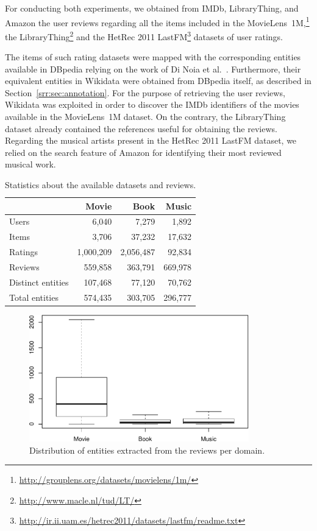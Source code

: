 For conducting both experiments, we obtained from IMDb, LibraryThing, and Amazon the user reviews regarding all the items included in the MovieLens~1M,\footnote{\url{http://grouplens.org/datasets/movielens/1m/}} the LibraryThing\footnote{\url{http://www.macle.nl/tud/LT/}} and the HetRec 2011 LastFM\footnote{\url{http://ir.ii.uam.es/hetrec2011/datasets/lastfm/readme.txt}} datasets of user ratings.

The items of such rating datasets were mapped with the corresponding entities available in DBpedia relying on the work of Di Noia et al.~\cite{DiNoia2016}. Furthermore, their equivalent entities in Wikidata were obtained from DBpedia itself, as described in Section~\ref{srr:sec:annotation}. For the purpose of retrieving the user reviews, Wikidata was exploited in order to discover the IMDb identifiers of the movies available in the MovieLens~1M dataset. On the contrary, the LibraryThing dataset already contained the references useful for obtaining the reviews. Regarding the musical artists present in the HetRec 2011 LastFM dataset, we relied on the search feature of Amazon for identifying their most reviewed musical work.

\begin{table}
\centering
\begin{tabular}{@{}lrrr@{}}
\toprule
                   & Movie     & Book         & Music   \\ \midrule
Users              & 6,040     & 7,279        & 1,892   \\
Items              & 3,706     & 37,232       & 17,632  \\
Ratings            & 1,000,209 & 2,056,487    & 92,834  \\
Reviews            & 559,858   & 363,791      & 669,978 \\
Distinct entities  & 107,468   & 77,120       & 70,762  \\
Total entities     & 574,435   & 303,705      & 296,777 \\ \bottomrule
\end{tabular}
\caption[Statistics about datasets and reviews]{Statistics about the available datasets and reviews.}
\label{srr:tab:stats}
\end{table}

\begin{figure}
\centering
\includegraphics[width=0.85\textwidth]{boxplot}
\caption[Entities extracted from the reviews]{Distribution of entities extracted from the reviews per domain.}
\label{srr:fig:boxplot}
\end{figure}

